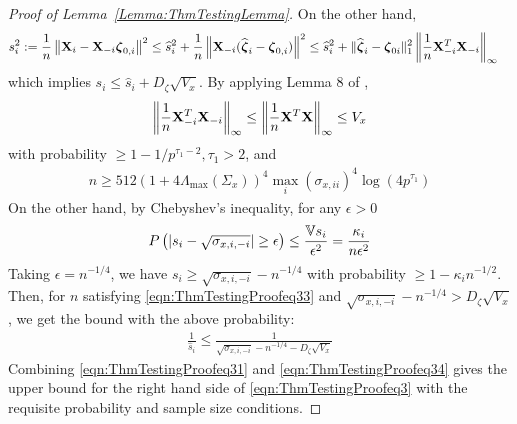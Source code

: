 \begin{proof}[Proof of Lemma~\ref{Lemma:ThmTestingLemma}]
On the other hand,
%
\begin{align*}
s_i^2 := \frac{1}{n} \left\| {\mathbf{X}}_i - {\mathbf{X}}_{-i}  {\boldsymbol{\zeta}}_{0,i} \right\|^2 & \leq 
\widehat s_i^2 + \frac{1}{n} \left\| {\mathbf{X}}_{-i} (\widehat {{\boldsymbol{\zeta}}}_i - {\boldsymbol{\zeta}}_{0,i} ) \right\|^2
\leq \widehat s_i^2 + \| \widehat {{\boldsymbol{\zeta}}}_i - {\boldsymbol{\zeta}}_{0i} \|_1^2 \left\| \frac{1}{n} {\mathbf{X}}_{-i}^T {\mathbf{X}}_{-i} \right\|_\infty
\end{align*}
%
which implies $s_i \leq \widehat s_i + D_\zeta \sqrt{ V_x}$. By applying Lemma 8 of \cite{RavikumarEtal11},
%
\begin{align}\label{eqn:ThmTestingProofeq32}
\left\| \frac{1}{n} {\mathbf{X}}_{-i}^T {\mathbf{X}}_{-i} \right\|_\infty \leq
\left\| \frac{1}{n} {\mathbf{X}}^T {\mathbf{X}} \right\|_\infty \leq V_x
\end{align}
%
with probability $ \geq 1 - 1/p^{\tau_1-2}, \tau_1>2$, and
%
\begin{align}\label{eqn:ThmTestingProofeq33}
n \geq 512 ( 1 + 4 \Lambda_{\max} (\Sigma_{x}))^4 \max_i (\sigma_{x,ii} )^4 \log (4p^{\tau_1})
\end{align}
%
On the other hand, by Chebyshev's inequality, for any $\epsilon>0$
%
$$
P\left( | s_i - \sqrt{ \sigma_{x,i,-i}} | \geq \epsilon \right) \leq \frac{{\mathbb{V}} s_i}{\epsilon^2} =
\frac{\kappa_i}{n \epsilon^2}
$$
%
Taking $\epsilon = n^{-1/4}$, we have $s_i \geq \sqrt{ \sigma_{x,i,-i}} - n^{-1/4}$ with probability $\geq 1 - \kappa_i n^{-1/2}$. Then, for $n$ satisfying \eqref{eqn:ThmTestingProofeq33} and $\sqrt{ \sigma_{x,i,-i}} - n^{-1/4} >  D_\zeta \sqrt{ V_x} $, we get the bound with the above probability:
%
\begin{align}\label{eqn:ThmTestingProofeq34}
\frac{1}{\widehat s_i} \leq \frac{1}{\sqrt{ \sigma_{x,i,-i}} - n^{-1/4} - D_\zeta \sqrt{ V_x}}
\end{align}
%
Combining \eqref{eqn:ThmTestingProofeq31} and \eqref{eqn:ThmTestingProofeq34} gives the upper bound for the right hand side of \eqref{eqn:ThmTestingProofeq3} with the requisite probability and sample size conditions.


\end{proof}
